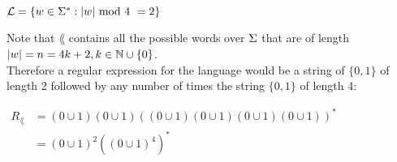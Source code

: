 $\mathcal{L} = \{ w \in \Sigma^* : |w| \text{ mod 4 } = 2\}$

Note that $\lang$ contains all the possible words over $\Sigma$
that are of length $|w|=n=4k+2, k \in \mathbb{N} \cup \{0\}$. \\
Therefore a regular expression for the language would be a string of $\{0,1\}$ of length 2
followed by any number of times the string $\{0,1\}$ of length 4:

$
    \begin{aligned}
        R_\lang & =(0 \cup 1)(0 \cup 1)((0 \cup 1)(0 \cup 1)(0 \cup 1)(0 \cup 1))^* \\
                & =(0 \cup 1)^2((0 \cup 1)^4)^*
    \end{aligned}
$ \\
